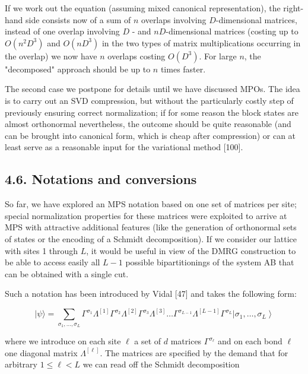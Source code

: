 \documentclass[12pt]{article}
\begin{document}
If we work out the equation (assuming mixed canonical representation), the right-hand side consists now of a sum of $n$ overlaps involving $D$-dimensional matrices, instead of one overlap involving $D$ - and $n D$-dimensional matrices (costing up to $O\left(n^{2} D^{3}\right)$ and $O\left(n D^{3}\right)$ in the two types of matrix multiplications occurring in the overlap) we now have $n$ overlaps costing $O\left(D^{3}\right)$. For large $n$, the "decomposed" approach should be up to $n$ times faster.

The second case we postpone for details until we have discussed MPOs. The idea is to carry out an SVD compression, but without the particularly costly step of previously ensuring correct normalization; if for some reason the block states are almost orthonormal nevertheless, the outcome should be quite reasonable (and can be brought into canonical form, which is cheap after compression) or can at least serve as a reasonable input for the variational method [100].

\subsection*{4.6. Notations and conversions}
So far, we have explored an MPS notation based on one set of matrices per site; special normalization properties for these matrices were exploited to arrive at MPS with attractive additional features (like the generation of orthonormal sets of states or the encoding of a Schmidt decomposition). If we consider our lattice with sites 1 through $L$, it would be useful in view of the DMRG construction to be able to access easily all $L-1$ possible bipartitionings of the system AB that can be obtained with a single cut.

Such a notation has been introduced by Vidal [47] and takes the following form:


\begin{equation*}
|\psi\rangle=\sum_{\sigma_{1}, \ldots, \sigma_{L}} \Gamma^{\sigma_{1}} \Lambda^{[1]} \Gamma^{\sigma_{2}} \Lambda^{[2]} \Gamma^{\sigma_{3}} \Lambda^{[3]} \ldots \Gamma^{\sigma_{L-1}} \Lambda^{[L-1]} \Gamma^{\sigma_{L}}\left|\sigma_{1}, \ldots, \sigma_{L}\right\rangle \tag{156}
\end{equation*}


where we introduce on each site $\ell$ a set of $d$ matrices $\Gamma^{\sigma_{\ell}}$ and on each bond $\ell$ one diagonal matrix $\Lambda^{[\ell]}$. The matrices are specified by the demand that for arbitrary $1 \leq \ell<L$ we can read off the Schmidt decomposition
\end{document}
